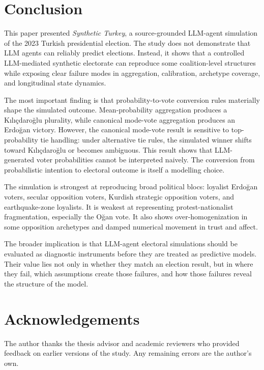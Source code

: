 \documentclass[pdflatex,sn-mathphys-num,iicol]{sn-jnl}
\begin{document}
\section{Conclusion}\label{sec:conclusion}

This paper presented \textit{Synthetic Turkey}, a source-grounded LLM-agent simulation of the 2023 Turkish presidential election. The study does not demonstrate that LLM agents can reliably predict elections. Instead, it shows that a controlled LLM-mediated synthetic electorate can reproduce some coalition-level structures while exposing clear failure modes in aggregation, calibration, archetype coverage, and longitudinal state dynamics.

The most important finding is that probability-to-vote conversion rules materially shape the simulated outcome. Mean-probability aggregation produces a Kılıçdaroğlu plurality, while canonical mode-vote aggregation produces an Erdoğan victory. However, the canonical mode-vote result is sensitive to top-probability tie handling: under alternative tie rules, the simulated winner shifts toward Kılıçdaroğlu or becomes ambiguous. This result shows that LLM-generated voter probabilities cannot be interpreted naively. The conversion from probabilistic intention to electoral outcome is itself a modelling choice.

The simulation is strongest at reproducing broad political blocs: loyalist Erdoğan voters, secular opposition voters, Kurdish strategic opposition voters, and earthquake-zone loyalists. It is weakest at representing protest-nationalist fragmentation, especially the Oğan vote. It also shows over-homogenization in some opposition archetypes and damped numerical movement in trust and affect.

The broader implication is that LLM-agent electoral simulations should be evaluated as diagnostic instruments before they are treated as predictive models. Their value lies not only in whether they match an election result, but in where they fail, which assumptions create those failures, and how those failures reveal the structure of the model.

\section*{Acknowledgements}

The author thanks the thesis advisor and academic reviewers who provided feedback on earlier versions of the study. Any remaining errors are the author's own.
\end{document}
